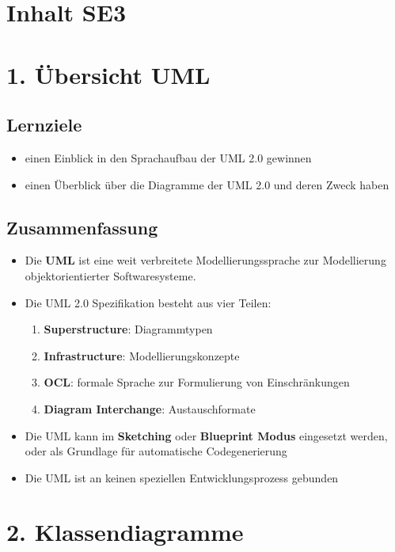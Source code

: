 \section{Inhalt SE3}

\section*{1. Übersicht UML}

\subsection*{Lernziele}
\begin{itemize}
    \item einen Einblick in den Sprachaufbau der UML 2.0 gewinnen
    \item einen Überblick über die Diagramme der UML 2.0 und deren Zweck haben
\end{itemize}

\subsection*{Zusammenfassung}
\begin{itemize}
    \item Die \textbf{UML} ist eine weit verbreitete Modellierungssprache zur Modellierung objektorientierter Softwaresysteme.
    \item Die UML 2.0 Spezifikation besteht aus vier Teilen:
    \begin{enumerate}
        \item \textbf{Superstructure}: Diagrammtypen
        \item \textbf{Infrastructure}: Modellierungskonzepte
        \item \textbf{OCL}: formale Sprache zur Formulierung von Einschränkungen
        \item \textbf{Diagram Interchange}: Austauschformate
    \end{enumerate}
    \item Die UML kann im \textbf{Sketching} oder \textbf{Blueprint Modus} eingesetzt werden, oder als Grundlage für automatische Codegenerierung
    \item Die UML ist an keinen speziellen Entwicklungsprozess gebunden
\end{itemize}

\section*{2. Klassendiagramme}


